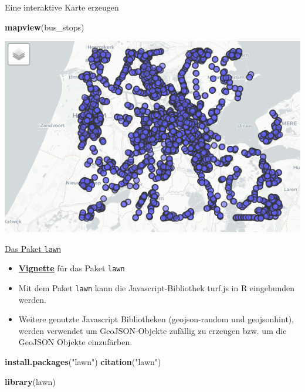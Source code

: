 \documentclass[ignorenonframetext,]{beamer}
\newenvironment{Shaded}{\begin{snugshade}}{\end{snugshade}}
\newcommand{\KeywordTok}[1]{\textcolor[rgb]{0.26,0.66,0.93}{\textbf{#1}}}
\newcommand{\NormalTok}[1]{\textcolor[rgb]{0.74,0.68,0.62}{#1}}
\newcommand{\StringTok}[1]{\textcolor[rgb]{0.02,0.61,0.04}{#1}}
\begin{document}
\begin{frame}[fragile]{Eine interaktive Karte erzeugen}
\protect\hypertarget{eine-interaktive-karte-erzeugen}{}

\begin{Shaded}
\begin{Highlighting}[]
\KeywordTok{mapview}\NormalTok{(bus_stops)}
\end{Highlighting}
\end{Shaded}

\includegraphics{figure/interaktive_busstops_amsterdam.PNG}

\end{frame}

\begin{frame}[fragile]{\href{https://cran.r-project.org/web/packages/lawn/index.html}{Das
Paket \texttt{lawn}}}
\protect\hypertarget{das-paket-lawn}{}

\begin{itemize}
\item
  \href{https://cran.r-project.org/web/packages/lawn/vignettes/lawn_vignette.html}{\textbf{Vignette}}
  für das Paket \texttt{lawn}
\item
  Mit dem Paket \texttt{lawn} kann die Javascript-Bibliothek turf.js in
  R eingebunden werden.
\item
  Weitere genutzte Javascript Bibliotheken (geojson-random und
  geojsonhint), werden verwendet um GeoJSON-Objekte zufällig zu erzeugen
  bzw. um die GeoJSON Objekte einzufärben.
\end{itemize}

\begin{Shaded}
\begin{Highlighting}[]
\KeywordTok{install.packages}\NormalTok{(}\StringTok{"lawn"}\NormalTok{)}
\KeywordTok{citation}\NormalTok{(}\StringTok{"lawn"}\NormalTok{)}
\end{Highlighting}
\end{Shaded}

\begin{Shaded}
\begin{Highlighting}[]
\KeywordTok{library}\NormalTok{(lawn)}
\end{Highlighting}
\end{Shaded}

\end{frame}
\end{document}

